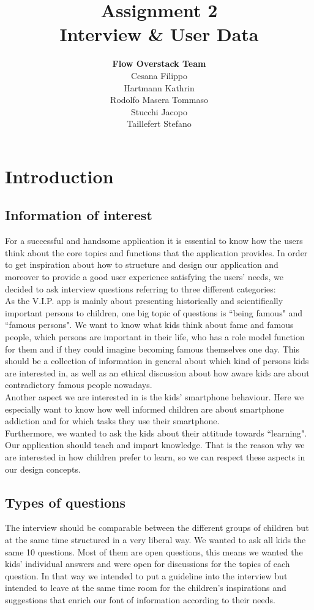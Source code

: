 \documentclass[12pt]{scrartcl}
\title{Assignment 2\\ Interview \& User Data}
\author{\textbf{Flow Overstack Team}\\ Cesana Filippo\\ Hartmann Kathrin\\ Rodolfo Masera Tommaso\\ Stucchi Jacopo\\ Taillefert Stefano}
\date{}
\begin{document}
\maketitle

\section*{Introduction}
	\subsection*{Information of interest}
		For a successful and handsome application it is essential to know how the users think about the core topics and functions that the application provides. In order to get inspiration about how to structure and design our application and moreover to provide a good user experience satisfying the users' needs, we decided to ask interview questions referring to three different categories:\\
		
		As the V.I.P. app is mainly about presenting historically and scientifically important persons to children, one big topic of questions is ``being famous" and ``famous persons". We want to know what kids think about fame and famous people, which persons are important in their life, who has a role model function for them and if they could imagine becoming famous themselves one day. This should be a collection of information in general about which kind of persons kids are interested in, as well as an ethical discussion about how aware kids are about contradictory famous people nowadays.\\
		
		Another aspect we are interested in is the kids' smartphone behaviour. Here we especially want to know how well informed children are about smartphone addiction and for which tasks they use their smartphone.\\
		
		Furthermore, we wanted to ask the kids about their attitude towards ``learning". Our application should teach and impart knowledge. That is the reason why we are interested in how children prefer to learn, so we can respect these aspects in our design concepts.\\
		
	\subsection*{Types of questions}
		The interview should be comparable between the different groups of children but at the same time structured in a very liberal way. We wanted to ask all kids the same 10 questions. Most of them are open questions, this means we wanted the kids' individual answers and were open for discussions for the topics of each question. In that way we intended to put a guideline into the interview but intended to leave at the same time room for the children's inspirations and suggestions that enrich our font of information according to their needs.
\end{document}
